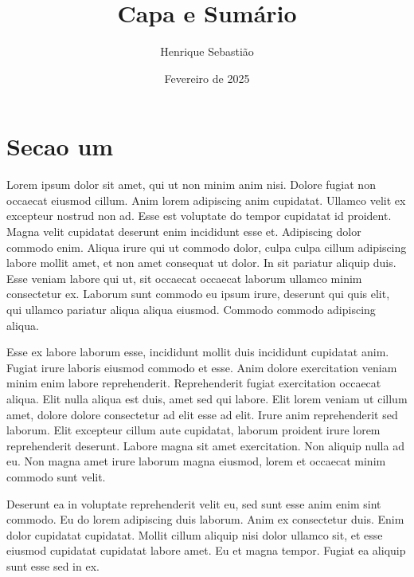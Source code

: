 \documentclass{article}
\begin{document}
\title{\textbf{\Huge Capa e Sumário}}
\author{Henrique Sebastião}
\date{Fevereiro de 2025}
\maketitle

\thispagestyle{empty}

\newpage

\setcounter{page}{1}

\tableofcontents
\newpage

\setcounter{page}{1}

\section{Secao um}

Lorem ipsum dolor sit amet, qui ut non minim anim nisi. Dolore fugiat
non occaecat eiusmod cillum.
Anim lorem adipiscing anim cupidatat. Ullamco velit ex excepteur
nostrud non ad. Esse est voluptate do tempor cupidatat id proident.
Magna velit cupidatat deserunt enim incididunt esse et. Adipiscing
dolor commodo enim.
Aliqua irure qui ut commodo dolor, culpa culpa cillum adipiscing
labore mollit amet, et non amet consequat ut dolor.
In sit pariatur aliquip duis. Esse veniam labore qui ut, sit occaecat
occaecat laborum ullamco minim consectetur ex.
Laborum sunt commodo eu ipsum irure, deserunt qui quis elit, qui
ullamco pariatur aliqua aliqua eiusmod. Commodo commodo adipiscing aliqua.

Esse ex labore laborum esse, incididunt mollit duis incididunt
cupidatat anim. Fugiat irure laboris eiusmod commodo et esse. Anim
dolore exercitation veniam minim enim labore reprehenderit.
Reprehenderit fugiat exercitation occaecat aliqua. Elit nulla aliqua
est duis, amet sed qui labore.
Elit lorem veniam ut cillum amet, dolore dolore consectetur ad elit
esse ad elit. Irure anim reprehenderit sed laborum.
Elit excepteur cillum aute cupidatat, laborum proident irure lorem
reprehenderit deserunt. Labore magna sit amet exercitation.
Non aliquip nulla ad eu. Non magna amet irure laborum magna eiusmod,
lorem et occaecat minim commodo sunt velit.

Deserunt ea in voluptate reprehenderit velit eu, sed sunt esse anim
enim sint commodo.
Eu do lorem adipiscing duis laborum. Anim ex consectetur duis. Enim
dolor cupidatat cupidatat.
Mollit cillum aliquip nisi dolor ullamco sit, et esse eiusmod
cupidatat cupidatat labore amet. Eu et magna tempor.
Fugiat ea aliquip sunt esse sed in ex.
\end{document}
